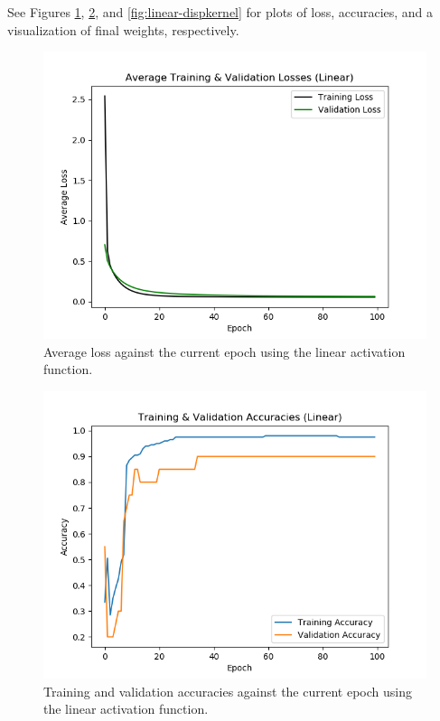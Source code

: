 \documentclass{article}
\begin{document}
\begin{enumerate}
\begin{enumerate}
                See Figures \ref{fig:linear-loss},
                \ref{fig:linear-accuracies}, and
                \ref{fig:linear-dispkernel}
                for plots of loss, accuracies, and a visualization of final weights,
                respectively.
                \begin{figure}[ht]
                  \begin{center}
                    \includegraphics[width=0.7\linewidth]{figures/linear-loss.png}
                    \caption{Average loss against the current epoch using the linear
                      activation function.}
                    \label{fig:linear-loss}
                  \end{center}
                \end{figure}
                \begin{figure}[ht]
                  \begin{center}
                    \includegraphics[width=0.7\linewidth]{figures/linear-accuracies.png}
                    \caption{Training and validation accuracies against the current epoch
                      using the linear activation function.}
                    \label{fig:linear-accuracies}
                  \end{center}

\end{figure}
\end{enumerate}
\end{enumerate}
\end{document}
